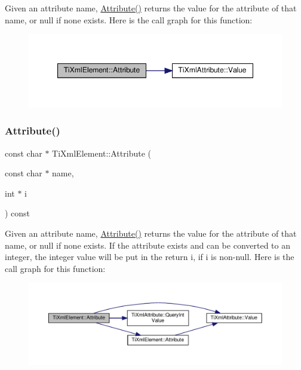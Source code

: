 Given an attribute name, \hyperlink{classTiXmlElement_a6042f518748f475a7ac4b4e0b509eb05}{Attribute()} returns the value for the attribute of that name, or null if none exists. Here is the call graph for this function\+:
\nopagebreak
\begin{figure}[H]
\begin{center}
\leavevmode
\includegraphics[width=347pt]{classTiXmlElement_a6042f518748f475a7ac4b4e0b509eb05_cgraph}
\end{center}
\end{figure}
\mbox{\label{classTiXmlElement_a8005d0b808fd02bd1246710cdf95e5f6}} 
\subsubsection{\texorpdfstring{Attribute()}{Attribute()}\hspace{0.1cm}{\footnotesize\ttfamily [2/3]}}
{\footnotesize\ttfamily const char $\ast$ Ti\+Xml\+Element\+::\+Attribute (\begin{DoxyParamCaption}\item[{const char $\ast$}]{name,  }\item[{int $\ast$}]{i }\end{DoxyParamCaption}) const}

Given an attribute name, \hyperlink{classTiXmlElement_a6042f518748f475a7ac4b4e0b509eb05}{Attribute()} returns the value for the attribute of that name, or null if none exists. If the attribute exists and can be converted to an integer, the integer value will be put in the return \textquotesingle{}i\textquotesingle{}, if \textquotesingle{}i\textquotesingle{} is non-\/null. Here is the call graph for this function\+:
\nopagebreak
\begin{figure}[H]
\begin{center}
\leavevmode
\includegraphics[width=350pt]{classTiXmlElement_a8005d0b808fd02bd1246710cdf95e5f6_cgraph}
\end{center}
\end{figure}
\mbox{\label{classTiXmlElement_a09df893402d0ab1402c8725e6d30ec04}} 
